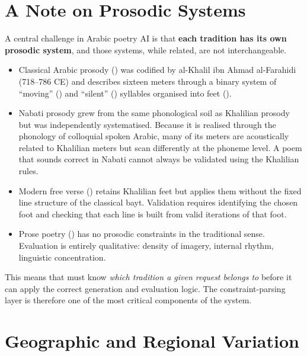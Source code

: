 \section{A Note on Prosodic Systems}
\label{sec:landscape_prosody_note}

A central challenge in Arabic poetry AI is that \textbf{each tradition has its own prosodic system}, and those systems, while related, are not interchangeable.

\begin{itemize}
  \item Classical Arabic prosody () was codified by al-Khalil ibn Ahmad al-Farahidi (718–786 CE) and describes sixteen meters through a binary system of ``moving'' () and ``silent'' () syllables organised into feet ().

  \item Nabati prosody grew from the same phonological soil as Khalilian prosody but was independently systematised. Because it is realised through the phonology of colloquial spoken Arabic, many of its meters are acoustically related to Khalilian meters but scan differently at the phoneme level. A poem that sounds correct in Nabati cannot always be validated using the Khalilian rules.

  \item Modern free verse () retains Khalilian feet but applies them without the fixed line structure of the classical bayt. Validation requires identifying the chosen foot and checking that each line is built from valid iterations of that foot.

  \item Prose poetry () has no prosodic constraints in the traditional sense. Evaluation is entirely qualitative: density of imagery, internal rhythm, linguistic concentration.
\end{itemize}

This means that \poeteng{} must know \textit{which tradition a given request belongs to} before it can apply the correct generation and evaluation logic. The constraint-parsing layer is therefore one of the most critical components of the system.

\section{Geographic and Regional Variation}
\label{sec:landscape_geography}

